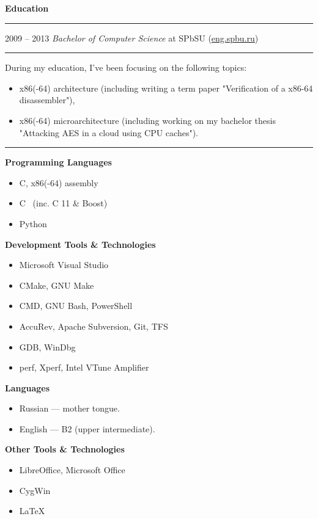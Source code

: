 \documentclass[11pt]{article}
\newcommand\CXX{%
  C\nolinebreak[4]\hspace{-.05em}\raisebox{.4ex}{\relsize{-3}{\textbf{++}}}%
}
\newcommand\CvSmallSkipLength{0.5em}
\newcommand\CvBigSkipLength{1em}
\newcommand\CvSkip[1]{\vspace{#1}}
\newcommand\CvSmallSkip{\CvSkip{\CvSmallSkipLength}}
\newcommand\CvBigSkip{\CvSkip{\CvBigSkipLength}}
\newcommand\CvSectionHeader[1]{\CvBigSkip\textbf{#1}\CvBigSkip}
\newcommand\CvRule{\begingroup\color{CvRuleColor}\hrule\endgroup}
\newcommand\CvWorkplaceHeader[5]{\begingroup%
  \CvRule
  \fboxsep0pt%
  \colorbox{CvWorkplaceHeaderColor}{%
    \begin{minipage}{\linewidth-2\fboxsep}%
\CvSmallSkip
#1 -- #2 \hfill \textit{#3} at #4 (\href{http://#5/}{#5})
\CvSmallSkip
    \end{minipage}%
  }%
  \CvRule
\endgroup}
\newenvironment{CvWorkplaceDescription}{%
    \begingroup\setlength\parskip{\CvSmallSkipLength}%
  }{%
    \CvSmallSkip\endgroup%
  }
\begin{document}
\CvSectionHeader{Education}

\CvWorkplaceHeader{2009}{2013}{Bachelor of Computer Science}{SPbSU}{eng.spbu.ru}

\begin{CvWorkplaceDescription}
During my education, I've been focusing on the following topics:
\begin{itemize}[noitemsep]
\item x86(-64) architecture (including writing a term paper "Verification of a x86-64 disassembler"),
\item x86(-64) microarchitecture (including working on my bachelor thesis "Attacking AES in a cloud using CPU caches").
\end{itemize}
\end{CvWorkplaceDescription}
\CvRule

\begin{minipage}[t]{.49\linewidth}
\CvSectionHeader{Programming Languages}

\begin{itemize}
\item C, x86(-64) assembly
\item \CXX\ (inc. {\CXX}11 \& Boost)
\item Python
\end{itemize}

\CvSectionHeader{Development Tools \& Technologies}

\begin{itemize}
\item Microsoft Visual Studio
\item CMake, GNU Make
\item CMD, GNU Bash, PowerShell
\item AccuRev, Apache Subversion, Git, TFS
\item GDB, WinDbg
\item perf, Xperf, Intel VTune Amplifier
\end{itemize}
\hfill
\end{minipage}
\begin{minipage}[t]{.49\linewidth}
\CvSectionHeader{Languages}

\begin{itemize}
\item Russian --- mother tongue.
\item English --- B2 (upper intermediate).
\end{itemize}

\CvSectionHeader{Other Tools \& Technologies}

\begin{itemize}
\item LibreOffice, Microsoft Office
\item CygWin
\item \LaTeX
\end{itemize}
\end{minipage}
\end{document}

